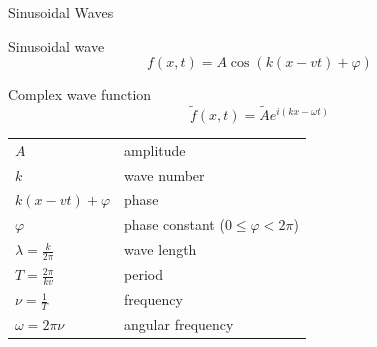 \documentclass{beamer}
\begin{document}
\begin{frame}{Sinusoidal Waves}
    \begin{block}{Sinusoidal wave}
        \begin{equation}
            f(x, t) = A \cos(k (x - vt) + \varphi)
        \end{equation}
    \end{block}

    \begin{block}{Complex wave function}
        \begin{equation}
            \tilde{f}(x, t) = \tilde{A} e^{i(kx-\omega t)}
        \end{equation}
    \end{block}

    \begin{table}[htbp]
        \centering
        \begin{tabular}{ll}
            $A$                        & amplitude                                 \\
            $k$                        & wave number                               \\
            $k(x-vt)+\varphi$          & phase                                     \\
            $\varphi$                  & phase constant ($0 \leq \varphi < 2 \pi$) \\
            $\lambda = \frac{k}{2\pi}$ & wave length                               \\
            $T = \frac{2\pi}{kv}$      & period                                    \\
            $\nu = \frac{1}{T}$        & frequency                                 \\
            $\omega = 2\pi \nu$        & angular frequency                         \\
        \end{tabular}
    \end{table}

\end{frame}
\end{document}
